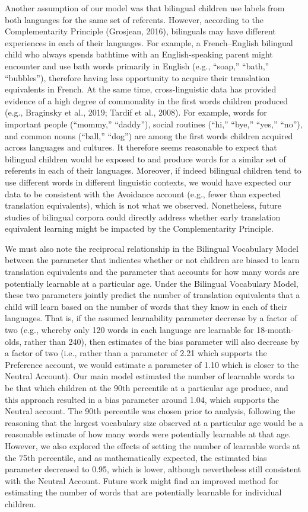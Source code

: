 \documentclass[
  english,
  ,man,floatsintext]{apa6}
\begin{document}
Another assumption of our model was that bilingual children use labels from both languages for the same set of referents. However, according to the Complementarity Principle (Grosjean, 2016), bilinguals may have different experiences in each of their languages. For example, a French--English bilingual child who always spends bathtime with an English-speaking parent might encounter and use bath words primarily in English (e.g., ``soap,'' ``bath,'' ``bubbles''), therefore having less opportunity to acquire their translation equivalents in French. At the same time, cross-linguistic data has provided evidence of a high degree of commonality in the first words children produced (e.g., Braginsky et al., 2019; Tardif et al., 2008). For example, words for important people (``mommy,'' ``daddy''), social routines (``hi,'' ``bye,'' ``yes,'' ``no''), and common nouns (``ball,'' ``dog'') are among the first words children acquired across languages and cultures. It therefore seems reasonable to expect that bilingual children would be exposed to and produce words for a similar set of referents in each of their languages. Moreover, if indeed bilingual children tend to use different words in different linguistic contexts, we would have expected our data to be consistent with the Avoidance account (e.g., fewer than expected translation equivalents), which is not what we observed. Nonetheless, future studies of bilingual corpora could directly address whether early translation equivalent learning might be impacted by the Complementarity Principle.

We must also note the reciprocal relationship in the Bilingual Vocabulary Model between the parameter that indicates whether or not children are biased to learn translation equivalents and the parameter that accounts for how many words are potentially learnable at a particular age. Under the Bilingual Vocabulary Model, these two parameters jointly predict the number of translation equivalents that a child will learn based on the number of words that they know in each of their languages. That is, if the assumed learnability parameter decrease by a factor of two (e.g., whereby only 120 words in each language are learnable for 18-month-olds, rather than 240), then estimates of the bias parameter will also decrease by a factor of two (i.e., rather than a parameter of 2.21 which supports the Preference account, we would estimate a parameter of 1.10 which is closer to the Neutral Account). Our main model estimated the number of learnable words to be that which children at the 90th percentile at a particular age produce, and this approach resulted in a bias parameter around 1.04, which supports the Neutral account. The 90th percentile was chosen prior to analysis, following the reasoning that the largest vocabulary size observed at a particular age would be a reasonable estimate of how many words were potentially learnable at that age. However, we also explored the effects of setting the number of learnable words at the 75th percentile, and as mathematically expected, the estimated bias parameter decreased to 0.95, which is lower, although nevertheless still consistent with the Neutral Account. Future work might find an improved method for estimating the number of words that are potentially learnable for individual children.
\end{document}
